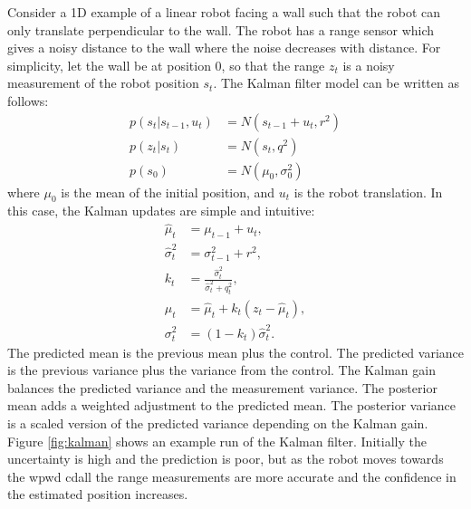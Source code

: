 \documentclass{article}
\begin{document}
Consider  a 1D example of a linear robot facing a wall such that the robot can only translate perpendicular to the wall.  The robot has a range sensor which gives a noisy distance to the wall where the noise decreases with distance.  For simplicity, let the wall be at position 0, so that the range $z_t$ is a noisy measurement of the robot position $s_t$.  The Kalman filter model can be written as follows:
\begin{align}
p(s_t | s_{t-1}, u_t) &= N(s_{t-1} + u_t, r^2) \\
p(z_t | s_t) &= N(s_t,  q^2) \\
p(s_0) &= N(\mu_0, \sigma^2_0)
\end{align}
where $\mu_0$ is the mean of the initial position, and $u_t$ is the robot translation.  In this case, the Kalman updates are simple and intuitive:
\begin{align}
\hat{\mu}_t &= \mu_{t-1} + u_t, \\
\hat{\sigma}^2_t &= \sigma^2_{t-1} + r^2, \\
k_t &= \frac{\hat{\sigma}^2_t}{\hat{\sigma}^2_t + q^2_t}, \\
\mu_t &= \hat{\mu}_t + k_t (z_t - \hat{\mu}_t), \\
\sigma^2_t &= (1 - k_t) \hat{\sigma}^2_t.
\end{align}
The predicted mean is the previous mean plus the control.  The predicted variance is the previous variance plus the variance from the control.  The Kalman gain balances the predicted variance and the measurement variance.  The posterior mean adds a weighted adjustment to the predicted mean.  The posterior variance is a scaled version of the predicted variance depending on the Kalman gain.  Figure \ref{fig:kalman} shows an example run of the Kalman filter.  Initially the uncertainty is high and the prediction is poor, but as the robot moves towards the wpwd
cdall the range measurements are more accurate and the confidence in the estimated position increases.
\end{document}
